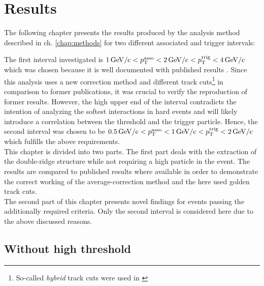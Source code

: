 \chapter{Results}
\label{chap:results}
The following chapter presents the results produced by the analysis method described in ch. \ref{chap:methods} for two different associated and trigger \pt intervals:

The first interval investigated is $\SI{1}{GeV/c} < p_{\text{T}}^{\text{asso}} < \SI{2}{GeV/c} < p_{\text{T}}^{\text{trig}} < \SI{4}{GeV/c}$ which was chosen because it is well documented with published results \cite{Abelev2012}. Since this analysis uses a new correction method and different track cuts\footnote{So-called \emph{hybrid} track cuts were used in \cite{Abelev2012}} in comparison to former publications, it was crucial to verify the reproduction of former results. However, the high upper end of the \pttrig interval contradicts the intention of analyzing the softest interactions in hard events and will likely introduce a correlation between the threshold and the trigger particle. Hence, the second interval was chosen to be $\SI{0.5}{GeV/c} < p_{\text{T}}^{\text{asso}} < \SI{1}{GeV/c} < p_{\text{T}}^{\text{trig}} < \SI{2}{GeV/c}$ which fulfills the above requirements.\\

This chapter is divided into two parts. The first part deals with the extraction of the double-ridge structure while not requiring a high \pt particle in the event. The results are compared to published results where available in order to demonstrate the correct working of the average-correction method and the here used golden track cuts.\\

The second part of this chapter presents novel findings for events passing the additionally required \ptthresh criteria. Only the second interval is considered here due to the above discussed reasons.

\section[Without high \pt threshold]{Without high \ptbold  threshold}
\label{sec:no-thresh}

